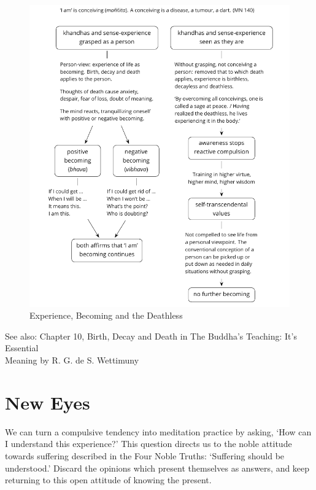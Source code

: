 \begin{figure}[h]
\caption{Experience, Becoming and the Deathless}\label{fig-experience-becoming-deathless}
\bigskip
\includegraphics[width=\linewidth]{./manuscript/tex/diagrams/experience-becoming-deathless.pdf}
\end{figure}

{\noindent\footnotesize
See also: Chapter 10, Birth, Decay and Death in The Buddha's Teaching: It's Essential\\ Meaning by R. G. de S. Wettimuny
\par}

\clearpage
\normalpagelayout

\section{New Eyes}


\noindent We can turn a compulsive tendency into meditation practice by
asking, `How can I understand this experience?' This question directs us
to the noble attitude towards suffering described in the Four Noble
Truths: `Suffering should be understood.' Discard the opinions which
present themselves as answers, and keep returning to this open attitude
of knowing the present.

